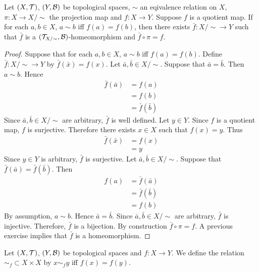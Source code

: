 \documentclass{book}
\begin{document}
	\begin{ex} 
		Let $(X, \mathcal{T})$, $(Y, \mathcal{B})$ be topological spaces, $\sim$ an eqivalence relation on $X$, $\pi:X \rightarrow X/\sim$ the projection map and $f:X \rightarrow Y$. Suppose $f$ is a quotient map. If for each $a, b \in X$, $a \sim b$ iff $f(a) = f(b)$, then there exists $\bar{f}: X/{\sim} \rightarrow Y$ such that $\bar{f}$ is a  $(\mathcal{T}_{X/{\sim}}, \mathcal{B})$-homeomorphism and $\bar{f} \circ \pi = f$.
	\end{ex}

	\begin{proof}
		Suppose that for each $a, b \in X$, $a \sim b$ iff $f(a) = f(b)$. Define $\bar{f}: {X / \sim } \rightarrow Y$ by $\bar{f}(\bar{x}) = f(x)$. Let $\bar{a}, \bar{b} \in X/ \sim$. Suppose that $\bar{a} = \bar{b}$. Then $a \sim b$. Hence 
		\begin{align*}
			\bar{f}(\bar{a})
			& = f(a) \\
			& = f(b) \\
			& = \bar{f}(\bar{b})
		\end{align*}
		Since $\bar{a}, \bar{b} \in X/ \sim$ are arbitrary, $\bar{f}$ is well defined. Let $y \in Y$. Since $f$ is a quotient map, $f$ is surjective. Therefore there exists $x \in X$ such that $f(x) = y$. Thus 
		\begin{align*}
			\bar{f}(\bar{x}) 
			& = f(x) \\
			& = y 
		\end{align*}
		Since $y \in Y$ is arbitrary, $\bar{f}$ is surjective. Let $\bar{a}, \bar{b} \in X/\sim$. Suppose that $\bar{f}(\bar{a}) = \bar{f}(\bar{b})$. Then 
		\begin{align*}
			f(a)
			& = \bar{f}(\bar{a}) \\
			& = \bar{f}(\bar{b}) \\
			& = f(b)
		\end{align*}
		By assumption, $a \sim b$. Hence $\bar{a} = \bar{b}$. Since $\bar{a}, \bar{b} \in X/\sim$ are arbitrary, $\bar{f}$ is injective. Therefore, $\bar{f}$ is a bijection. By construction $\bar{f} \circ \pi = f$. A previous exercise implies that $\bar{f}$ is a homeomorphism.
	\end{proof}

	\begin{defn} 
		Let $(X, \mathcal{T})$, $(Y, \mathcal{B})$ be topological spaces and $f:X \rightarrow Y$. We define the relation $\sim_f \subset X \times X$ by $x \sim_f y$ iff $f(x) = f(y)$. 
	\end{defn}
\end{document}
